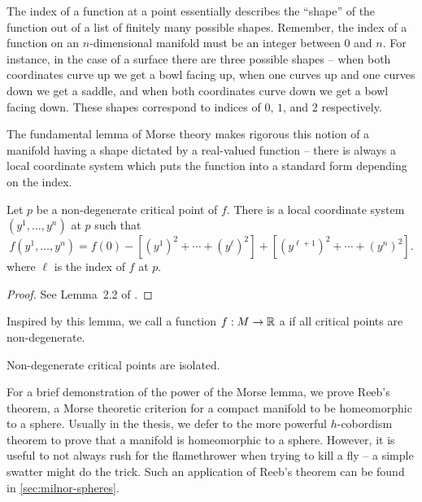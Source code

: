 The index of a function at a point essentially describes the ``shape'' of the function out of a list of finitely many possible shapes. Remember, the index of a function on an $n$-dimensional manifold must be an integer between $0$ and $n$. For instance, in the case of a surface there are three possible shapes -- when both coordinates curve up we get a bowl facing up, when one curves up and one curves down we get a saddle, and when both coordinates curve down we get a bowl facing down. These shapes correspond to indices of $0$, $1$, and $2$ respectively.

The fundamental lemma of Morse theory makes rigorous this notion of a manifold having a shape dictated by a real-valued function -- there is always a local coordinate system which puts the function into a standard form depending on the index.

\begin{lemma}\label{lemma:morse}
	Let $p$ be a non-degenerate critical point of $f$. There is a local coordinate system $(y^1,\ldots, y^n)$ at $p$ such that
	\begin{equation}
		f(y^1,\ldots, y^n)=f(0)-\left[(y^1)^2 + \cdots + (y^{\ell})^2\right] + \left[(y^{\ell + 1})^2 + \cdots + (y^n)^2\right].
	\end{equation}
	where $\ell$ is the index of $f$ at $p$.
\end{lemma}
\begin{proof}
	See Lemma~2.2 of \cite{milnor1963morse}.
\end{proof}

Inspired by this lemma, we call a function $f : M \to \mathbb{R}$ a  if all critical points are non-degenerate.

\begin{corollary}
	Non-degenerate critical points are isolated.
\end{corollary}

For a brief demonstration of the power of the Morse lemma, we prove Reeb's theorem, a Morse theoretic criterion for a compact manifold to be homeomorphic to a sphere. Usually in the thesis, we defer to the more powerful $h$-cobordism theorem to prove that a manifold is homeomorphic to a sphere.
However, it is useful to not always rush for the flamethrower when trying to kill a fly -- a simple swatter might do the trick.
Such an application of Reeb's theorem can be found in \cref{sec:milnor-spheres}.

